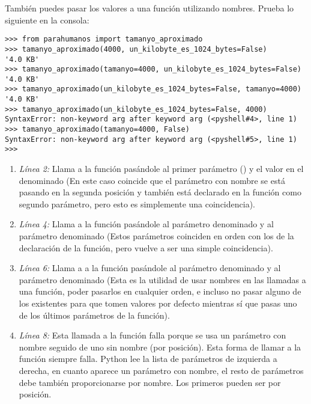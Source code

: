 También puedes pasar los valores a una función utilizando nombres. Prueba lo siguiente en la consola:

\begin{lstlisting}
>>> from parahumanos import tamanyo_aproximado
>>> tamanyo_aproximado(4000, un_kilobyte_es_1024_bytes=False)
'4.0 KB'
>>> tamanyo_aproximado(tamanyo=4000, un_kilobyte_es_1024_bytes=False)
'4.0 KB'
>>> tamanyo_aproximado(un_kilobyte_es_1024_bytes=False, tamanyo=4000)
'4.0 KB'
>>> tamanyo_aproximado(un_kilobyte_es_1024_bytes=False, 4000)
SyntaxError: non-keyword arg after keyword arg (<pyshell#4>, line 1)
>>> tamanyo_aproximado(tamanyo=4000, False)
SyntaxError: non-keyword arg after keyword arg (<pyshell#5>, line 1)
>>> 
\end{lstlisting}

\begin{enumerate}
\item \emph{Línea 2:} Llama a la función  pasándole  al primer parámetro () y el valor  en el denominado  (En este caso coincide que el parámetro con nombre se está pasando en la segunda posición y también está declarado en la función como segundo parámetro, pero esto es simplemente una coincidencia).

\item \emph{Línea 4:} Llama a la función  pasándole  al parámetro denominado  y  al parámetro denominado  (Estos parámetros coinciden en orden con los de la declaración de la función, pero vuelve a ser una simple coincidencia).

\item \emph{Línea 6:} Llama a a la función  pasándole  al parámetro denominado  y  al parámetro denominado  (Esta es la utilidad de usar nombres en las llamadas a una función, poder pasarlos en cualquier orden, e incluso no pasar alguno de los existentes para que tomen valores por defecto mientras sí que pasas uno de los últimos parámetros de la función).

\item \emph{Línea 8:} Esta llamada a la función falla porque se usa un parámetro con nombre seguido de uno sin nombre (por posición). Esta forma de llamar a la función siempre falla. Python lee la lista de parámetros de izquierda a derecha, en cuanto aparece un parámetro con nombre, el resto de parámetros debe también proporcionarse por nombre. Los primeros pueden ser por posición.


\end{enumerate}

